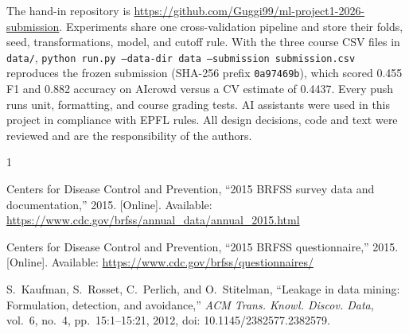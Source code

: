 \documentclass[10pt,conference,compsocconf]{IEEEtran}
\begin{document}
The hand-in repository is
\url{https://github.com/Guggi99/ml-project1-2026-submission}.  Experiments share
one cross-validation pipeline and store their folds, seed, transformations,
model, and cutoff rule.  With the three course CSV files in \texttt{data/},
\texttt{python run.py --data-dir data --submission submission.csv}
reproduces the frozen submission (SHA-256 prefix \texttt{0a97469b}), which
scored 0.455 F1 and 0.882 accuracy on AIcrowd versus a CV estimate of 0.4437.
Every push runs unit, formatting, and course grading tests.  AI assistants were
used in this project in compliance
with EPFL rules.  All design decisions, code and text were reviewed and are the
responsibility of the authors.

\begin{thebibliography}{1}

Centers for Disease Control and Prevention, ``2015 BRFSS survey data and
documentation,'' 2015. [Online]. Available:
\url{https://www.cdc.gov/brfss/annual_data/annual_2015.html}

Centers for Disease Control and Prevention, ``2015 BRFSS questionnaire,''
2015. [Online]. Available: \url{https://www.cdc.gov/brfss/questionnaires/}

S.~Kaufman, S.~Rosset, C.~Perlich, and O.~Stitelman, ``Leakage in data mining:
Formulation, detection, and avoidance,'' \emph{ACM Trans. Knowl. Discov. Data},
vol.~6, no.~4, pp.~15:1--15:21, 2012, doi: 10.1145/2382577.2382579.

\end{thebibliography}
\end{document}
